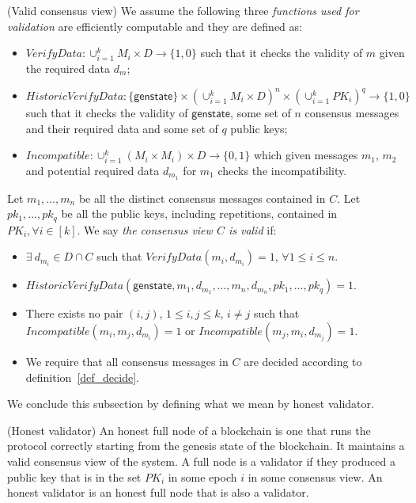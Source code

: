 \begin{dfn}(Valid consensus view)
\label{def:valid_consensus}
\noindent 
We assume the following three \emph{functions used for validation} are efficiently computable and they are defined as: 

\begin{itemize}
\item $\mathit{VerifyData}: \cup_{i=1}^k M_i \times D \rightarrow \{1, 0\}$ such that it 
checks the validity of $m$ given the required data $\mathit{d_{m}}$;
\item $\mathit{HistoricVerifyData}: \{\mathsf{genstate}\} \times (\cup_{i=1}^k M_i \times D)^n \times (\cup_{i=1}^k \mathit{PK_i})^q \rightarrow \{1, 0\}$ 
such that it checks the validity of $\mathsf{genstate}$, some set of $n$ consensus messages and their required data and some set of $q$ public keys;
\item $\mathit{Incompatible}: \cup_{i=1}^k (M_i \times M_i) \times D \rightarrow \{0,1\}$ which 
given messages $m_1$, $m_2$ and potential required data $d_{m_1}$ for $m_1$ checks the incompatibility.
\end{itemize}

\noindent Let $m_1,\ldots, m_n$ be all the distinct consensus messages contained in $C$. Let $\mathit{pk_1},\ldots, \mathit{pk_q}$ be all the 
public keys, including repetitions, contained in $\mathit{PK_i}, \forall i \in[k]$.
We say \emph{the consensus view $C$ is valid} if: 
\begin{itemize}
\item $\exists \ d_{m_i} \in D \cap C$ such that $\mathit{VerifyData}(m_i, d_{m_i}) = 1$, $\forall 1\leq i \leq n$. 
\item $\mathit{HistoricVerifyData}(\mathsf{genstate}, m_1, d_{m_1}, \ldots, m_n, d_{m_n}, \mathit{pk_1},\ldots, \mathit{pk_q}) = 1$. 
\item There exists no pair $(i,j)$, $1 \leq i,j \leq k$, $i \neq j$ such that $\mathit{Incompatible}(m_i, m_j, d_{m_i}) = 1$ 
or $\mathit{Incompatible}(m_j, m_i, d_{m_j}) = 1$.
\item We require that all consensus messages in $C$ are decided according to definition~\ref{def_decide}.
\end{itemize}
\end{dfn}

\noindent We conclude this subsection by defining what we mean by honest validator.
\begin{dfn}(Honest validator)
\label{def:honest_validator}
An honest full node of a blockchain is one that runs the protocol correctly starting from the genesis state of the blockchain. 
It maintains a valid consensus view of the system. A full node is a validator if they produced a public key that is in the set 
$\mathit{PK_i}$ in some epoch $i$ in some consensus view. An honest validator is an honest full node that is also a validator.
\end{dfn}
 
